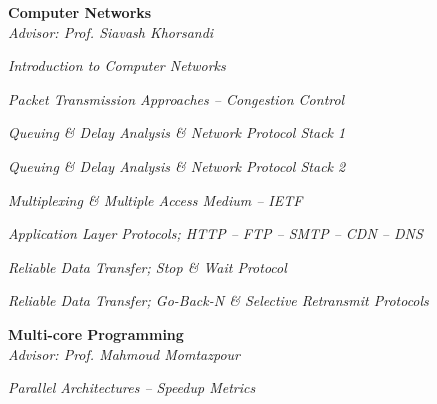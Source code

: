 \documentclass[margin, 10pt]{res} %
\begin{document}
\begin{resume}
        \textbf{Computer Networks}\\
		\textit{Advisor: Prof. Siavash Khorsandi}
		\begin{innerlist}
			\item \textit{Introduction to Computer Networks} \href{https://github.com/aligholamee/Compnets/raw/master/docs/assignment-1/compnet_assignment_1_9531504.pdf}{\hfill\UrlFont[docs]}
		
			\item \textit{Packet Transmission Approaches -- Congestion Control} \href{https://github.com/aligholamee/Compnets/raw/master/docs/assignment-2/compnet_assignment_2_9531504.pdf}{\hfill\UrlFont[docs]}

			\item \textit{Queuing \& Delay Analysis \& Network Protocol Stack 1} \href{https://github.com/aligholamee/Compnets/raw/master/docs/assignment-3/compnet_assignment_3_9531504.pdf}{\hfill\UrlFont[docs]}
			
			\item \textit{Queuing \& Delay Analysis \& Network Protocol Stack 2} \href{https://github.com/aligholamee/Compnets/raw/master/docs/assignment-4/compnet_assignment_4_9531504.pdf}{\hfill\UrlFont[docs]}
			
			\item \textit{Multiplexing \& Multiple Access Medium -- IETF} \href{https://github.com/aligholamee/Compnets/raw/master/docs/assignment-5/compnet_assignment_5_9531504.pdf}{\hfill\UrlFont[docs]}
			
			\item \textit{Application Layer Protocols; HTTP -- FTP -- SMTP -- CDN -- DNS} \href{https://github.com/aligholamee/Compnets/raw/master/docs/assignment-6/compnet_assignment_6_9531504.pdf}{\hfill\UrlFont[docs]}
			
			
			\item \textit{Reliable Data Transfer; Stop \& Wait Protocol} \href{https://github.com/aligholamee/Compnets/raw/master/docs/assignment-8/compnet_assignment_8_9531504.pdf}{\hfill\UrlFont[docs]}
			
			\item \textit{Reliable Data Transfer; Go-Back-N \& Selective Retransmit Protocols} \href{https://github.com/aligholamee/Compnets/raw/master/docs/assignment-9/compnet_assignment_9_9531504.pdf}{\hfill\UrlFont[docs]}
		\end{innerlist}
	
        \textbf{Multi-core Programming}\\
			\textit{Advisor: Prof. Mahmoud Momtazpour}
			\begin{innerlist}
				\item \textit{Parallel Architectures -- Speedup Metrics} \href{https://github.com/aligholamee/Parallax/raw/master/docs/assignment-1/MCP_9531504_HW1.pdf}{\hfill\UrlFont[docs]}
				

\end{innerlist}
\end{resume}
\end{document}
